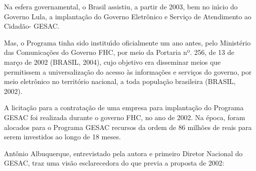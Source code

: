 \documentclass[
12pt,		%
openright,	%
twoside,  %
a4paper,			%
chapter=TITLE,		%
english,			%
french,				%
spanish,			%
brazil				%
]{USPSC-classe/USPSC}
\begin{document}
Na esfera governamental, o Brasil assistiu, a partir de 2003, bem no in\'{\i}cio do Governo Lula, a implanta\c{c}\~ao do Governo Eletr\^onico e Servi\c{c}o de Atendimento ao Cidad\~ao- GESAC.

















Mas, o Programa tinha sido institu\'{\i}do oficialmente um ano antes, pelo Minist\'erio das Comunica\c{c}\~oes do Governo FHC, por meio  da Portaria nº. 256, de 13 de mar\c{c}o de 2002 (BRASIL, 2004), cujo  objetivo era disseminar meios que permitissem a universaliza\c{c}\~ao do acesso \`as informa\c{c}\~oes e servi\c{c}os do governo, por meio eletr\^onico no territ\'orio nacional, a toda popula\c{c}\~ao brasileira (BRASIL, 2002).

















A licita\c{c}\~ao para a contrata\c{c}\~ao de uma empresa para implanta\c{c}\~ao do Programa GESAC foi realizada durante o governo FHC, no ano de 2002. Na \'epoca, foram alocados para o Programa GESAC recursos da ordem de 86 milh\~oes de reais para serem investidos ao longo de 18 meses.

















Ant\^onio Albuquerque, entrevistado pela autora e primeiro Diretor Nacional do GESAC, traz uma vis\~ao esclarecedora do que previa a proposta de 2002:
\end{document}
